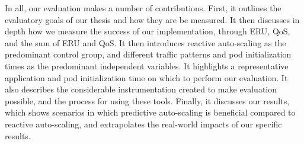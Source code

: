 In all, our evaluation makes a number of contributions. First, it outlines the
evaluatory goals of our thesis and how they are be measured. It then discusses
in depth how we measure the success of our implementation, through ERU,
QoS, and the sum of ERU and QoS. It then introduces reactive auto-scaling as the
predominant control group, and different traffic patterns and pod initialization
times as the predominant
independent variables. It highlights a representative application and pod
initialization time on which to perform our evaluation. It also describes the
considerable instrumentation created to make evaluation possible, and the process for
using these tools. Finally, it discusses our results, which shows scenarios in
which predictive auto-scaling is
beneficial compared to reactive auto-scaling, and extrapolates the real-world
impacts of our specific results.
